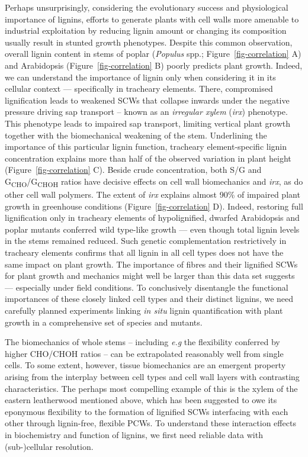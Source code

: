 \documentclass[journal=,manuscript=]{achemso}
\begin{document}
Perhaps unsurprisingly, considering the evolutionary success and
physiological importance of lignins, efforts to generate plants with
cell walls more amenable to industrial exploitation by reducing lignin
amount or changing its composition usually result in stunted growth
phenotypes.\citep{DeMeester2018, DeMeester2020, Menard2022, Sulis2023}
Despite this common observation, overall lignin content in stems of
poplar (\emph{Populus} spp.; Figure~\ref{fig-correlation} A) and
Arabidopsis (Figure~\ref{fig-correlation} B) poorly predicts plant
growth. Indeed, we can understand the importance of lignin only when
considering it in its cellular context --- specifically in tracheary
elements. There, compromised lignification leads to weakened SCWs that
collapse inwards under the negative pressure driving sap transport --
known as an \emph{irregular xylem} (\emph{irx}) phenotype. This
phenotype leads to impaired sap transport, limiting vertical plant
growth together with the biomechanical weakening of the stem.
Underlining the importance of this particular lignin function, tracheary
element-specific lignin concentration explains more than half of the
observed variation in plant height (Figure~\ref{fig-correlation} C).
Beside crude concentration, both S/G and
G\textsubscript{CHO}/G\textsubscript{CHOH} ratios have decisive effects
on cell wall biomechanics and \emph{irx},\citep{Menard2022} as do other
cell wall polymers. The extent of \emph{irx} explains almost 90\% of
impaired plant growth in greenhouse conditions
(Figure~\ref{fig-correlation} D). Indeed, restoring full lignification
only in tracheary elements of hypolignified, dwarfed Arabidopsis and
poplar mutants conferred wild type-like growth --- even though total
lignin levels in the stems remained
reduced.\citep{DeMeester2018, DeMeester2021} Such genetic
complementation restrictively in tracheary elements confirms that all
lignin in all cell types does not have the same impact on plant growth.
The importance of fibres and their lignified SCWs for plant growth and
mechanics might well be larger than this data set suggests ---
especially under field conditions. To conclusively disentangle the
functional importances of these closely linked cell types and their
distinct lignins, we need carefully planned experiments linking \emph{in
situ} lignin quantification with plant growth in a comprehensive set of
species and mutants.

The biomechanics of whole stems -- including \emph{e.g} the flexibility
conferred by higher CHO/CHOH ratios -- can be extrapolated reasonably
well from single cells.\citep{Menard2022} To some extent, however,
tissue biomechanics are an emergent property arising from the interplay
between cell types and cell wall layers with contrasting
characteristics. The perhaps most compelling example of this is the
xylem of the eastern leatherwood mentioned above, which has been
suggested to owe its eponymous flexibility to the formation of lignified
SCWs interfacing with each other through lignin-free, flexible
PCWs.\citep{Mottiar2020} To understand these interaction effects in
biochemistry and function of lignins, we first need reliable data with
(sub-)cellular resolution.
\end{document}
